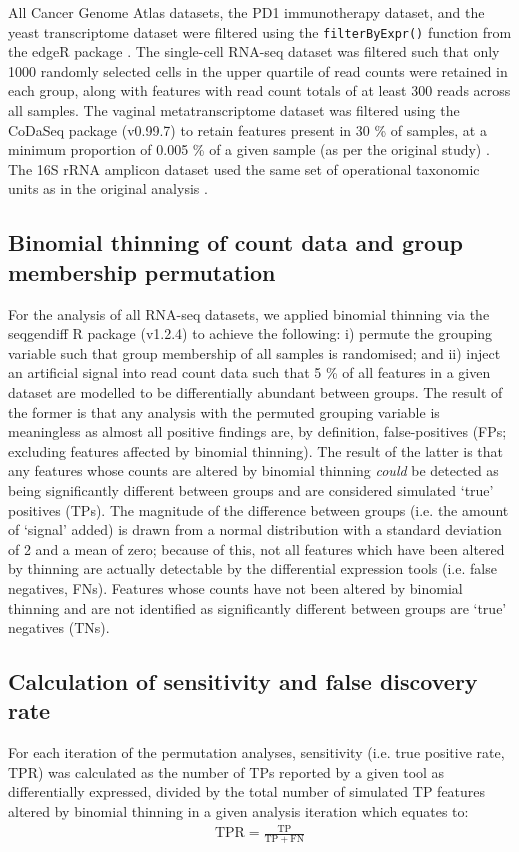 \documentclass[10pt,letterpaper]{article}
\begin{document}
All Cancer Genome Atlas datasets, the PD1 immunotherapy dataset, and the yeast transcriptome dataset were filtered using the \texttt{filterByExpr()} function from the edgeR package \cite{robinson_edger_2010}. The single-cell RNA-seq dataset was filtered such that only 1000 randomly selected cells in the upper quartile of read counts were retained in each group, along with features with read count totals of at least 300 reads across all samples. The vaginal metatranscriptome dataset was filtered using the CoDaSeq package (v0.99.7) \cite{gloor_codaseq} to retain features present in 30 \% of samples, at a minimum proportion of 0.005 \% of a given sample (as per the original study) \cite{dos_santos_vaginal_2024}. The 16S rRNA amplicon dataset used the same set of operational taxonomic units as in the original analysis \cite{bian_gut_2017}.

\subsection*{Binomial thinning of count data and group membership permutation}
For the analysis of all RNA-seq datasets, we applied binomial thinning via the seqgendiff R package (v1.2.4) \cite{gerard_data-based_2020} to achieve the following: i) permute the grouping variable such that group membership of all samples is randomised; and ii) inject an artificial signal into read count data such that 5 \% of all features in a given dataset are modelled to be differentially abundant between groups. The result of the former is that any analysis with the permuted grouping variable is meaningless as almost all positive findings are, by definition, false-positives (FPs; excluding features affected by binomial thinning). The result of the latter is that any features whose counts are altered by binomial thinning \emph{could} be detected as being significantly different between groups and are considered simulated `true' positives (TPs). The magnitude of the difference between groups (i.e. the amount of `signal' added) is drawn from a normal distribution with a standard deviation of 2 and a mean of zero; because of this, not all features which have been altered by thinning are actually detectable by the differential expression tools (i.e. false negatives, FNs). Features whose counts have not been altered by binomial thinning and are not identified as significantly different between groups are `true' negatives (TNs).

\subsection*{Calculation of sensitivity and false discovery rate}
For each iteration of the permutation analyses, sensitivity (i.e. true positive rate, TPR) was calculated as the number of TPs reported by a given tool as differentially expressed, divided by the total number of simulated TP features altered by binomial thinning in a given analysis iteration which equates to:
\begin{eqnarray}
	\label{eq:TPR}
	\mathrm{TPR} = \frac{\mathrm{TP}}{\mathrm{TP} + \mathrm{FN}}
 \end{eqnarray}
 
\end{document}
